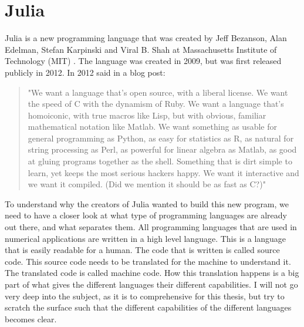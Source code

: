 \section{Julia}
\label{sec:Julia}
Julia is a new programming language that was created by Jeff Bezanson, Alan Edelman, Stefan Karpinski and Viral B. Shah at Massachusetts Institute of Technology (MIT) \citep{juliaLab}. The language was created in 2009, but was first released publicly in 2012. In 2012 \cite{juliaBlogRelease2012} said in a blog post:
\begin{quotation}
"We want a language that’s open source, with a liberal license. We want the speed of C with the dynamism of Ruby. We want a language that’s homoiconic, with true macros like Lisp, but with obvious, familiar mathematical notation like Matlab. We want something as usable for general programming as Python, as easy for statistics as R, as natural for string processing as Perl, as powerful for linear algebra as Matlab, as good at gluing programs together as the shell. Something that is dirt simple to learn, yet keeps the most serious hackers happy. We want it interactive and we want it compiled. (Did we mention it should be as fast as C?)"
\end{quotation}
To understand why the creators of Julia wanted to build this new program, we need to have a closer look at what type of programming languages are already out there, and what separates them. All programming languages that are used in numerical applications are written in a high level language. This is a language that is easily readable for a human. The code that is written is called source code. This source code needs to be translated for the machine to understand it. The translated code is called machine code. How this translation happens is a big part of what gives the different languages their different capabilities. I will not go very deep into the subject, as it is to comprehensive for this thesis, but try to scratch the surface such that the different capabilities of the different languages becomes clear.

